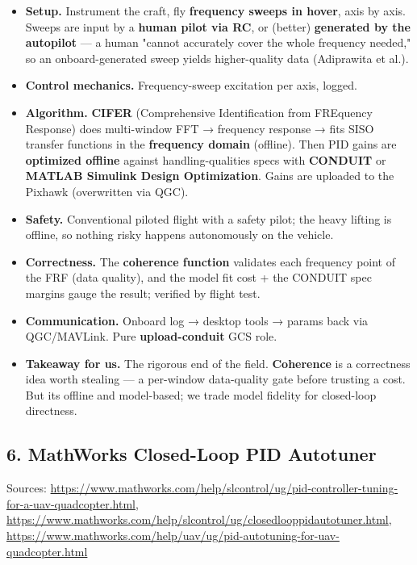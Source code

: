 \documentclass[
  11pt,
]{article}
\providecommand{\tightlist}{%
  \setlength{\itemsep}{0pt}\setlength{\parskip}{0pt}}
\begin{document}
\begin{itemize}
\tightlist
\item
  \textbf{Setup.} Instrument the craft, fly \textbf{frequency sweeps in
  hover}, axis by axis. Sweeps are input by a \textbf{human pilot via
  RC}, or (better) \textbf{generated by the autopilot} --- a human
  "cannot accurately cover the whole frequency needed," so an
  onboard-generated sweep yields higher-quality data (Adiprawita et
  al.).
\item
  \textbf{Control mechanics.} Frequency-sweep excitation per axis,
  logged.
\item
  \textbf{Algorithm.} \textbf{CIFER} (Comprehensive Identification from
  FREquency Response) does multi-window FFT → frequency response → fits
  SISO transfer functions in the \textbf{frequency domain} (offline).
  Then PID gains are \textbf{optimized offline} against
  handling-qualities specs with \textbf{CONDUIT} or \textbf{MATLAB
  Simulink Design Optimization}. Gains are uploaded to the Pixhawk
  (overwritten via QGC).
\item
  \textbf{Safety.} Conventional piloted flight with a safety pilot; the
  heavy lifting is offline, so nothing risky happens autonomously on the
  vehicle.
\item
  \textbf{Correctness.} The \textbf{coherence function} validates each
  frequency point of the FRF (data quality), and the model fit cost +
  the CONDUIT spec margins gauge the result; verified by flight test.
\item
  \textbf{Communication.} Onboard log → desktop tools → params back via
  QGC/MAVLink. Pure \textbf{upload-conduit} GCS role.
\item
  \textbf{Takeaway for us.} The rigorous end of the field.
  \textbf{Coherence} is a correctness idea worth stealing --- a
  per-window data-quality gate before trusting a cost. But
  it\textquotesingle s offline and model-based; we trade model fidelity
  for closed-loop directness.
\end{itemize}

\hypertarget{6-mathworks-closed-loop-pid-autotuner}{%
\subsection{6. MathWorks Closed-Loop PID
Autotuner}\label{6-mathworks-closed-loop-pid-autotuner}}

Sources:
\url{https://www.mathworks.com/help/slcontrol/ug/pid-controller-tuning-for-a-uav-quadcopter.html},
\url{https://www.mathworks.com/help/slcontrol/ug/closedlooppidautotuner.html},
\url{https://www.mathworks.com/help/uav/ug/pid-autotuning-for-uav-quadcopter.html}
\end{document}
